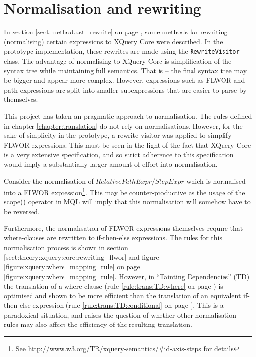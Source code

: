\section{Normalisation and rewriting}
\label{sect:disc:rewriting}
In section \ref{sect:method:ast_rewrite} on page
\pageref{sect:method:ast_rewrite}, some methods for rewriting (normalising)
certain expressions to XQuery Core were described. In the prototype implementation,
these rewrites are made using the \texttt{RewriteVisitor} class. The advantage
of normalising to XQuery Core is simplification of the syntax tree while
maintaining full semantics. That is -- the final syntax tree may be bigger and
appear more complex. However, expressions such as FLWOR and path expressions
are split into smaller subexpressions that are easier to parse by themselves. 

This project has taken an pragmatic approach to normalisation. The rules
defined in chapter \ref{chapter:translation} do not rely on normalisations.
However, for the sake of simplicity in the prototype, a rewrite visitor was 
applied to simplify FLWOR expressions. This must be seen in the light of the
fact that XQuery Core is a very extensive specification\cite{xquery_semantics},
and so strict adherence to this specification would imply a substantially
larger amount of effort into normalisation.

Consider the normalisation of $RelativePathExpr/StepExpr$ which is normalised
into a FLWOR expression\footnote{See
http://www.w3.org/TR/xquery-semantics/\#id-axis-steps for details}. This may be
counter-productive as the usage of the \textsf{scope()} operator in MQL will
imply that this normalisation will somehow have to be reversed.

Furthermore, the normalisation of FLWOR expressions themselves require that
where-clauses are rewritten to if-then-else expressions. The rules for this
normalisation process is shown in section
\ref{sect:theory:xquery:core:rewriting_flwor} and figure
\ref{figure:xquery:where_mapping_rule} on page 
\ref{figure:xquery:where_mapping_rule}. However, in ``Tainting Dependencies''
(TD) the translation of a where-clause (rule \ref{rule:trans:TD:where} on page
\pageref{rule:trans:TD:where}) is optimised and shown to be more efficient than
the translation of an equivalent if-then-else expression (rule
\ref{rule:trans:TD:conditional} on page \pageref{rule:trans:TD:conditional}).
This is a paradoxical situation, and raises the question of whether other
normalisation rules may also affect the efficiency of the resulting
translation.

